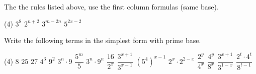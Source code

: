 \begin{solution*}
	The the rules listed above, use the first column formulas (same base).
	\begin{tasks}(4)
		\task $3^8$
		\task $2^{n+2}$
		\task $3^{m-2n}$
		\task $5^{2x-2}$
	\end{tasks}
\end{solution*}
\begin{exercise}
	Write the following terms in the simplest form with prime base.
	\begin{tasks}(4)
		\task $8$ \task $25$ \task $27$ \task $4^3$
		\task $9^2$ \task $3^n\cdot 9$ \task $\dfrac{5^m}{5}$ \task $3^n\cdot 9^n$
		\task $\dfrac{16}{2^x}$ \task $\dfrac{3^{x+1}}{3^{x-1}}$ \task $\left(5^4\right)^{x-1}$ \task $2^x\cdot 2^{2-x}$
		\task $\dfrac{2^y}{4^x}$ \task $\dfrac{4^y}{8^x}$ \task $\dfrac{3^{x+1}}{3^{1-x}}$ \task $\dfrac{2^t\cdot 4^t}{8^{t-1}}$
	\end{tasks}
\end{exercise}